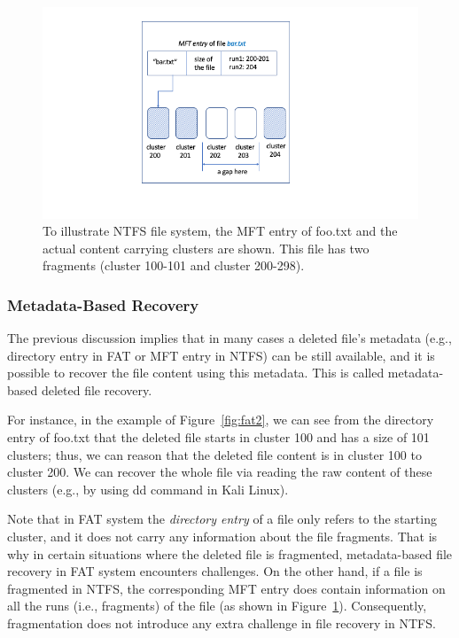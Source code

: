  \begin{figure}[h]
     \centering
     \includegraphics[width=\linewidth]{fig/ntfs.png}
     \caption{To illustrate NTFS file system, the MFT entry of foo.txt and the actual content carrying clusters are shown. 
 This file has two fragments (cluster 100-101 and cluster 200-298).}
     \label{fig:ntfs}
 \end{figure}
 

\subsubsection{Metadata-Based Recovery}\label{subsubsec:meta-recovery}
\begin{paraphrase}
 The previous discussion implies that in many cases a deleted file's metadata 
(e.g., directory entry in FAT or MFT entry in NTFS) can be still available, 
and it is possible to recover the file content using this metadata. 
This is called metadata-based deleted file recovery.

For instance, in the example of Figure~\ref{fig:fat2},
we can see from the directory entry of foo.txt that 
the deleted file starts in cluster 100 and has a size of 101 clusters;
thus, we can reason that the deleted file content is in cluster 100 to cluster 200.
We can recover the whole file via reading the raw content of these clusters (e.g., by using dd command in Kali Linux). 

Note that in FAT system the \emph{directory entry} of a file only refers to the starting cluster, and it does not carry any information about the file fragments.
That is why in certain situations where the deleted file is fragmented, metadata-based file recovery in FAT system encounters challenges.
On the other hand, if a file is fragmented in NTFS, the corresponding MFT entry does contain information on all the runs (i.e., fragments) of the file
(as shown in Figure~\ref{fig:ntfs}). Consequently, fragmentation does not introduce any extra challenge in file recovery in NTFS.
\end{paraphrase}

